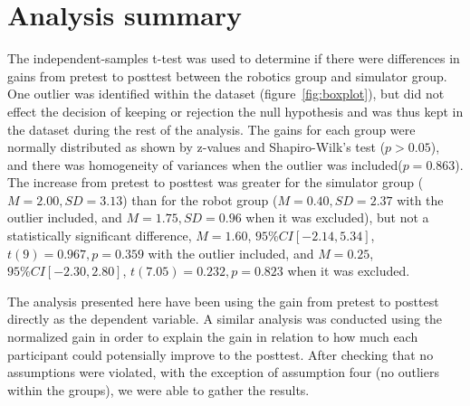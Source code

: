 \section{Analysis summary}
The independent-samples t-test was used to determine if there were differences in gains from pretest to posttest between the robotics group and simulator group. One outlier was identified within the dataset (figure~\ref{fig:boxplot}), but did not effect the decision of keeping or rejection the null hypothesis and was thus kept in the dataset during the rest of the analysis. 
The gains for each group were normally distributed as shown by z-values and Shapiro-Wilk's test ($p > 0.05$), and there was homogeneity of variances when the outlier was included($p = 0.863$). The increase from pretest to posttest was greater for the simulator group ($M = 2.00, SD = 3.13$) than for the robot group ($M = 0.40, SD = 2.37$ with the outlier included, and $M=1.75, SD = 0.96$ when it was excluded), but not a statistically significant difference, $M = 1.60$, $95\% CI [-2.14, 5.34]$, $t(9) = 0.967, p = 0.359$ with the outlier included, and $M = 0.25$, $95\% CI [-2.30, 2.80]$, $t(7.05) = 0.232, p = 0.823$ when it was excluded.

\bigskip\noindent
The analysis presented here have been using the gain from pretest to posttest directly as the dependent variable. A similar analysis was conducted using the normalized gain in order to explain the gain in relation to how much each participant could potensially improve to the posttest. After checking that no assumptions were violated, with the exception of assumption four (no outliers within the groups), we were able to gather the results. 


